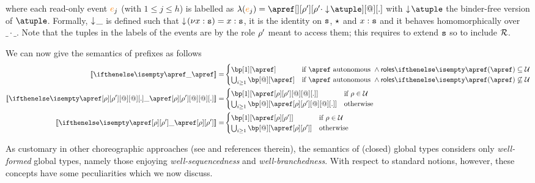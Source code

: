 where each read-only event ${\color{orange}{e}}_j$ (with $1 \leq j \leq h$) is labelled as  
$\alf (\ae_j) = \apref[][\arole'][\arole' \cdot \eraseB\atuple][@][.]$  
%
%
with 
$\eraseB\atuple$ the binder-free version of $\atuple$. 
Formally, $\downarrow\!{\_}$ is defined  such that 
$\downarrow\!{(\nu x:\mathtt{s})} = x : \mathtt{s}$,  it is the identity on $\mathtt{s}$, $\star$ and $x : \mathtt{s}$ and it behaves 
homomorphically over $\_\cdot\_$. 
%
Note that the tuples in the labels of the events are  by the 
role $\rho'$ meant to access  them; this requires to extend $\mathtt{s}$ so to
include  $\mathcal{R}$.



We can now give the semantics of prefixes as follows
\begin{align*}
  \ksem{\apref} =
  &
    \begin{cases}
      \bp[1][\apref]
      & \text{if $\apref$ autonomous } \land \roles{\apref} \subseteq \participants
      \\
      \bigcup_{i \geq 1}\bp[@][\apref]
      & \text{if $\apref$ autonomous } \land \roles{\apref} \not\subseteq \participants
    \end{cases}
  \\
  \ksem{\apref[\arole][\arole'][@][@][.]} =
  &
    \begin{cases}
      \bp[1][{\apref[\arole][\arole'][@][@][.]}]
      & \text{if } \arole \in \participants
      \\
      \bigcup_{i \geq 1}\bp[@][{\apref[\arole][\arole'][@][@][.]}]
      & \text{otherwise}
    \end{cases}
  \\
  \ksem{\apref[\arole][\arole']} =
  &
    \begin{cases}
      \bp[1][{\apref[\arole][\arole']}]
      & \text{if } \arole \in \participants
      \\
      \bigcup_{i \geq 1}\bp[@][{\apref[\arole][\arole']}]
      & \text{otherwise}
    \end{cases}
\end{align*}

As customary in other choreographic approaches (see
\cite{DBLP:journals/csur/HuttelLVCCDMPRT16,dd09,gt17} and
references therein), the semantics of (closed) global types considers
only \emph{well-formed} global types, namely those enjoying
\emph{well-sequencedness} and \emph{well-branchedness}.
%
With respect to standard notions, however, these concepts have some
peculiarities which we now discuss.

